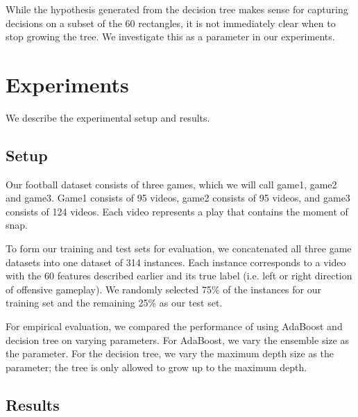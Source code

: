 \documentclass{article} %
\begin{document}
While the hypothesis generated from the decision tree makes sense for capturing decisions on a subset of the 60 rectangles, it is not immediately clear when to stop growing the tree. We investigate this as a parameter in our experiments.

\section{Experiments}

We describe the experimental setup and results.

\subsection{Setup}

Our football dataset consists of three games, which we will call game1, game2 and game3. Game1 consists of 95 videos, game2 consists of 95 videos, and game3 consists of 124 videos. Each video represents a play that contains the moment of snap.

To form our training and test sets for evaluation, we concatenated all three game datasets into one dataset of 314 instances. Each instance corresponds to a video with the 60 features described earlier and its true label (i.e. left or right direction of offensive gameplay). We randomly selected 75\% of the instances for our training set and the remaining 25\% as our test set.

For empirical evaluation, we compared the performance of using AdaBoost and decision tree on varying parameters. For AdaBoost, we vary the ensemble size as the parameter. For the decision tree, we vary the maximum depth size as the parameter; the tree is only allowed to grow up to the maximum depth.

\subsection{Results}
\end{document}
